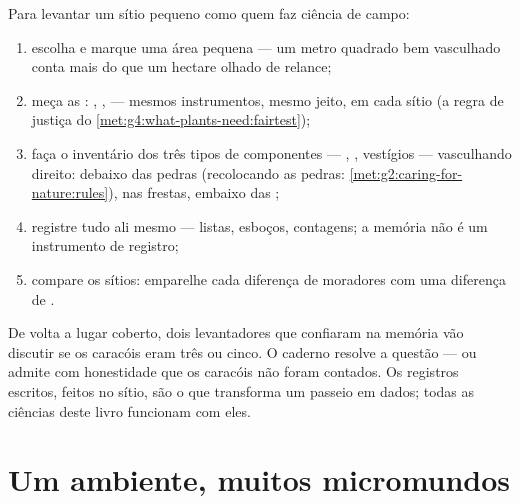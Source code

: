 \begin{method}\label{met:g6:exploring-our-environment:survey}
Para levantar um sítio pequeno como quem faz ciência de campo:
\begin{enumerate}
  \item escolha e marque uma área pequena --- um metro quadrado bem
        vasculhado conta mais do que um hectare olhado de relance;
  \item meça as : , ,  --- mesmos
        instrumentos, mesmo jeito, em cada sítio (a regra de justiça
        do \cref{met:g4:what-plants-need:fairtest});
  \item faça o inventário dos três tipos de componentes --- , , vestígios --- vasculhando direito:
        debaixo das pedras (recolocando as pedras:
        \cref{met:g2:caring-for-nature:rules}), nas frestas, embaixo
        das ;
  \item registre tudo ali mesmo --- listas, esboços, contagens; a
        memória não é um instrumento de registro;
  \item compare os sítios: emparelhe cada diferença de moradores com
        uma diferença de .
\end{enumerate}
\end{method}

\begin{remark}\label{rem:g6:exploring-our-environment:records}
De volta a lugar coberto, dois levantadores que confiaram na memória
vão discutir se os caracóis eram três ou cinco. O caderno resolve a
questão --- ou admite com honestidade que os caracóis não foram
contados. Os registros escritos, feitos no sítio, são o que
transforma um passeio em dados; todas as ciências deste livro
funcionam com eles.
\end{remark}

\section{Um ambiente, muitos micromundos}

